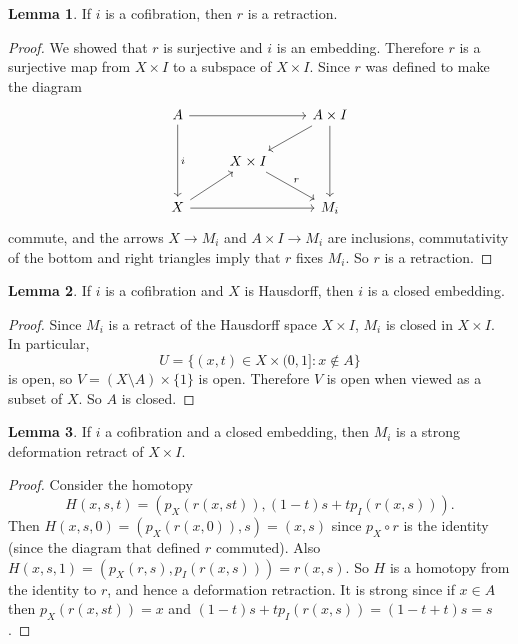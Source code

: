 \documentclass[10pt]{article}
\theoremstyle{definition}
\newtheorem{lemma}{Lemma}[exer]
\begin{document}
\begin{lemma}
If $i$ is a cofibration, then $r$ is a retraction.
\end{lemma}
\begin{proof}
We showed that $r$ is surjective and $i$ is an embedding. Therefore $r$ is a surjective map from $X \times I$ to a subspace of $X \times I$.
Since $r$ was defined to make the diagram
$$\begin{tikzcd}
A \arrow[rr] \arrow[dd,"i"] && A \times I \arrow[dl] \arrow[dd]\\
& X \times I \arrow[dr,"r"]\\
X \arrow[ur] \arrow[rr] && M_i
\end{tikzcd}$$
commute, and the arrows $X \to M_i$ and $A \times I \to M_i$ are inclusions, commutativity of the bottom and right triangles imply that $r$ fixes $M_i$.
So $r$ is a retraction.
\end{proof}

\begin{lemma}
If $i$ is a cofibration and $X$ is Hausdorff, then $i$ is a closed embedding.
\end{lemma}
\begin{proof}
Since $M_i$ is a retract of the Hausdorff space $X \times I$, $M_i$ is closed in $X \times I$.
In particular,
$$U = \{(x, t) \in X \times (0, 1]: x \notin A\}$$
is open, so $V = (X \setminus A) \times \{1\}$ is open.
Therefore $V$ is open when viewed as a subset of $X$. So $A$ is closed.
\end{proof}

\begin{lemma}
If $i$ a cofibration and a closed embedding, then $M_i$ is a strong deformation retract of $X \times I$.
\end{lemma}
\begin{proof}
Consider the homotopy
$$H(x, s, t) = (p_X(r(x, st)), (1 - t)s + tp_I(r(x, s))).$$
Then $H(x, s, 0) = (p_X(r(x, 0)), s) = (x, s)$ since $p_X \circ r$ is the identity (since the diagram that defined $r$ commuted).
Also $H(x, s, 1) = (p_X(r, s), p_I(r(x, s))) = r(x, s)$.
So $H$ is a homotopy from the identity to $r$, and hence a deformation retraction.
It is strong since if $x \in A$ then $p_X(r(x, st)) = x$ and $(1 - t)s + tp_I(r(x, s)) = (1 - t + t)s = s$.
\end{proof}
\end{document}
